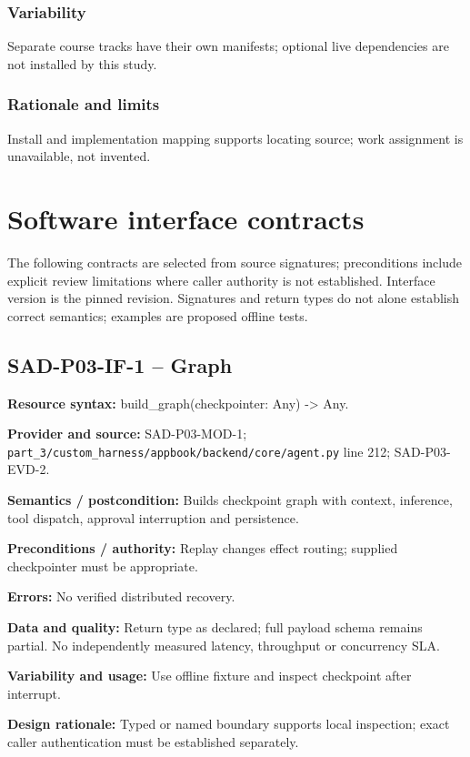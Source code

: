 \documentclass[10pt,letterpaper]{article}
\begin{document}
\subsubsection{Variability}
Separate course tracks have their own manifests; optional live dependencies are not installed by this study.
\subsubsection{Rationale and limits}
Install and implementation mapping supports locating source; work assignment is unavailable, not invented.

\section{Software interface contracts}
The following contracts are selected from source signatures; preconditions include explicit review limitations where caller authority is not established. Interface version is the pinned revision. Signatures and return types do not alone establish correct semantics; examples are proposed offline tests.
\subsection{SAD-P03-IF-1 -- Graph}
{\raggedright \textbf{Resource syntax:} build\_\allowbreak{}graph(\allowbreak{}checkpointer: Any) -> Any.\par}
\textbf{Provider and source:} SAD-P03-MOD-1; \nolinkurl{part_3/custom_harness/appbook/backend/core/agent.py} line 212; SAD-P03-EVD-2.\par
\textbf{Semantics / postcondition:} Builds checkpoint graph with context, inference, tool dispatch, approval interruption and persistence.\par
\textbf{Preconditions / authority:} Replay changes effect routing; supplied checkpointer must be appropriate.\par
\textbf{Errors:} No verified distributed recovery.\par
\textbf{Data and quality:} Return type as declared; full payload schema remains partial. No independently measured latency, throughput or concurrency SLA.\par
\textbf{Variability and usage:} Use offline fixture and inspect checkpoint after interrupt.\par
\textbf{Design rationale:} Typed or named boundary supports local inspection; exact caller authentication must be established separately.\par
\end{document}
